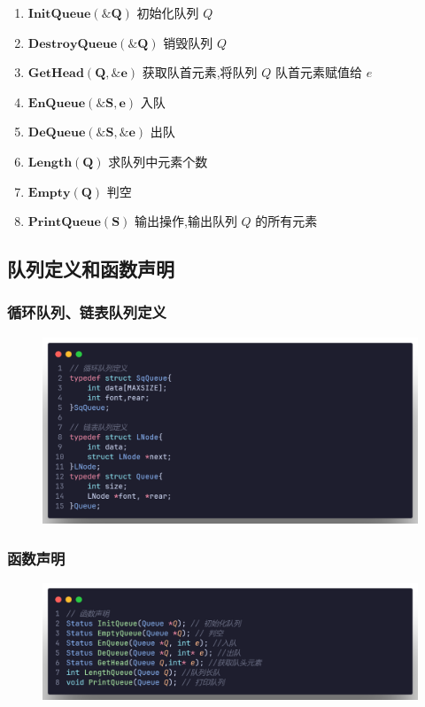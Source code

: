 \begin{definition}[队列基本操作]
    \begin{enumerate}
        \item $\mathbf{InitQueue(\& Q)}$  初始化队列 $Q$
        \item $\mathbf{DestroyQueue(\& Q)}$  销毁队列 $Q$
        \item $\mathbf{GetHead(Q,\&e)}$ 获取队首元素,将队列 $Q$ 队首元素赋值给 $e$
        \item $\mathbf{EnQueue(\&S,e)}$ 入队
        \item $\mathbf{DeQueue(\&S,\&e)}$ 出队
        \item $\mathbf{Length(Q)}$ 求队列中元素个数
        \item $\mathbf{Empty(Q)}$ 判空
        \item $\mathbf{PrintQueue(S)}$ 输出操作,输出队列 $Q$ 的所有元素 
    \end{enumerate}
\end{definition}
\subsection{队列定义和函数声明}
\subsubsection{循环队列、链表队列定义}

\begin{figure}[H]
    \centering
    \includegraphics[scale=0.2]{"figure/Note/Stack/QDefine.png"}
\end{figure}

\subsubsection{函数声明}

\begin{figure}[H]
    \centering
    \includegraphics[scale=0.2]{"figure/Note/Stack/QFunction.png"}
\end{figure}

